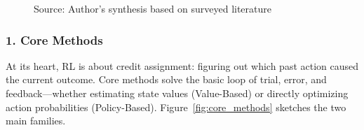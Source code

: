 \documentclass[12pt,a4paper]{report}
\theoremstyle{definition}
\newcommand{\source}[1]{\vspace{-0.5\baselineskip}\caption*{\small Source: #1}}
\begin{document}
\begin{figure}[htbp]
\caption{Taxonomy of 19 RL research categories organized into five clusters: \textbf{Core Algorithms} (policy/value/model-based methods), \textbf{Learning Paradigms} (how agents acquire behavior), \textbf{Advanced Methods} (multi-agent, hierarchical, safe exploration), \textbf{Applications} (domain-specific implementations), and \textbf{Infrastructure} (frameworks, benchmarks, surveys). Arrows indicate foundational dependencies.}
\label{fig:rl_taxonomy}
\source{Author's synthesis based on surveyed literature}
\end{figure}

\subsubsection*{1. Core Methods}
At its heart, RL is about credit assignment: figuring out which past action caused the current outcome. Core methods solve the basic loop of trial, error, and feedback---whether estimating state values (Value-Based) or directly optimizing action probabilities (Policy-Based). Figure~\ref{fig:core_methods} sketches the two main families.
\end{document}
